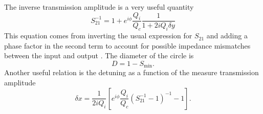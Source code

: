 The inverse transmission amplitude is a very useful quantity \begin{equation}
S_{21}^{-1} = 1 + e^{i\phi}\frac{Q_i}{Q_c}\frac{1}{1+2i Q_i \delta y} \end{equation}
This equation comes from inverting the usual expression for $S_{21}$ and adding a phase factor in the second term to account for possible impedance mismatches between the input and output \cite{Megrant:highQ2012}. The diameter of the circle is \begin{equation}
D = 1-S_{\textrm{min}}. \end{equation}
Another useful relation is the detuning as a function of the measure transmission amplitude \begin{equation}
\delta x = \frac{1}{2iQ_i}\left[ e^{i\phi} \frac{Q_i}{Q_c} \left(S_{21}^{-1} - 1 \right)^{-1} - 1 \right]. \end{equation}
